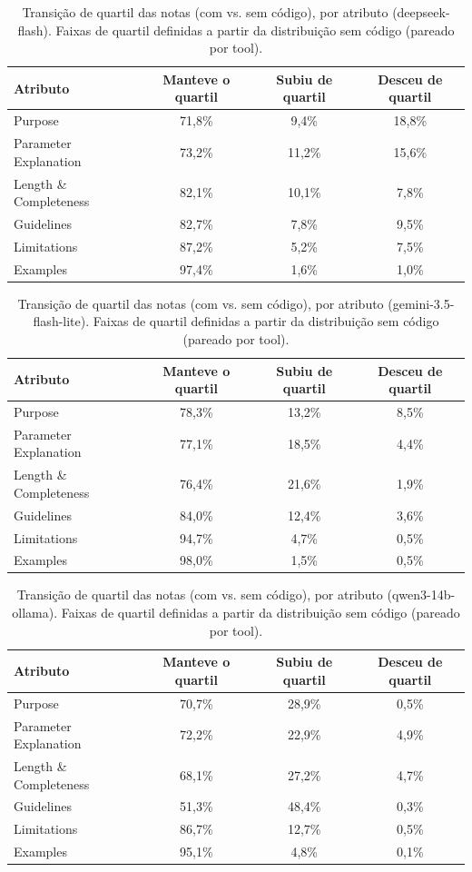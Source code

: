 \begin{table}[H]
\centering
\caption{Transição de quartil das notas (com vs. sem código), por atributo (deepseek-flash). Faixas de quartil definidas a partir da distribuição sem código (pareado por tool).}
\label{tab:transicao_quartis_deepseek_flash}
\begin{tabular}{lccc}
\toprule
Atributo & Manteve o quartil & Subiu de quartil & Desceu de quartil \\
\midrule
Purpose & 71,8\% & 9,4\% & 18,8\% \\
Parameter Explanation & 73,2\% & 11,2\% & 15,6\% \\
Length \& Completeness & 82,1\% & 10,1\% & 7,8\% \\
Guidelines & 82,7\% & 7,8\% & 9,5\% \\
Limitations & 87,2\% & 5,2\% & 7,5\% \\
Examples & 97,4\% & 1,6\% & 1,0\% \\
\bottomrule
\end{tabular}
\end{table}

\begin{table}[H]
\centering
\caption{Transição de quartil das notas (com vs. sem código), por atributo (gemini-3.5-flash-lite). Faixas de quartil definidas a partir da distribuição sem código (pareado por tool).}
\label{tab:transicao_quartis_gemini_3_5_flash_lite}
\begin{tabular}{lccc}
\toprule
Atributo & Manteve o quartil & Subiu de quartil & Desceu de quartil \\
\midrule
Purpose & 78,3\% & 13,2\% & 8,5\% \\
Parameter Explanation & 77,1\% & 18,5\% & 4,4\% \\
Length \& Completeness & 76,4\% & 21,6\% & 1,9\% \\
Guidelines & 84,0\% & 12,4\% & 3,6\% \\
Limitations & 94,7\% & 4,7\% & 0,5\% \\
Examples & 98,0\% & 1,5\% & 0,5\% \\
\bottomrule
\end{tabular}
\end{table}

\begin{table}[H]
\centering
\caption{Transição de quartil das notas (com vs. sem código), por atributo (qwen3-14b-ollama). Faixas de quartil definidas a partir da distribuição sem código (pareado por tool).}
\label{tab:transicao_quartis_qwen3_14b_ollama}
\begin{tabular}{lccc}
\toprule
Atributo & Manteve o quartil & Subiu de quartil & Desceu de quartil \\
\midrule
Purpose & 70,7\% & 28,9\% & 0,5\% \\
Parameter Explanation & 72,2\% & 22,9\% & 4,9\% \\
Length \& Completeness & 68,1\% & 27,2\% & 4,7\% \\
Guidelines & 51,3\% & 48,4\% & 0,3\% \\
Limitations & 86,7\% & 12,7\% & 0,5\% \\
Examples & 95,1\% & 4,8\% & 0,1\% \\
\bottomrule
\end{tabular}
\end{table}
